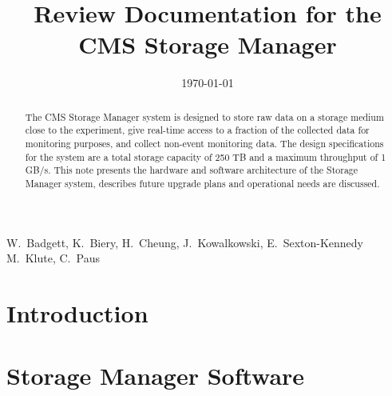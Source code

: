 \documentclass{cmspaper}
\begin{document}

\begin{titlepage}

   \date{\today}

  \title{Review Documentation for the\\ CMS Storage Manager}

  \begin{Authlist}
    W.~Badgett, K.~Biery, H.~Cheung, J.~Kowalkowski, 
    E.~Sexton-Kennedy
    M.~Klute, C.~Paus
  \end{Authlist}



  \begin{abstract}
The CMS Storage Manager system is designed to store raw data on a storage medium close to the
experiment, give real-time access to a fraction of the collected data for monitoring purposes, and
collect non-event monitoring data. The design specifications for the system are a total storage capacity
of 250 TB and a maximum throughput of 1 GB/s. This note presents the hardware and software
architecture of  the Storage Manager system, describes future upgrade plans and operational 
needs are discussed. 
  \end{abstract} 

  
\end{titlepage}

\setcounter{page}{2}%
\section{Introduction}    %


\section{Storage Manager Software}  %



\end{document}

